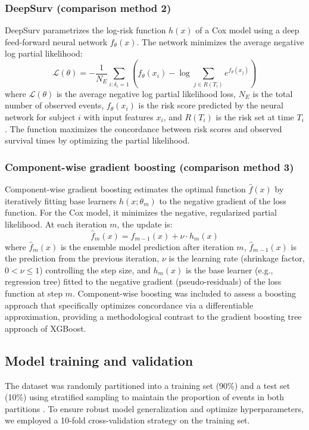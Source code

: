 \documentclass[pdflatex,sn-mathphys-num]{sn-jnl}%
\theoremstyle{thmstyleone}%
\theoremstyle{thmstyletwo}%
\theoremstyle{thmstylethree}%
\begin{document}
\subsubsection{DeepSurv (comparison method 2)}
DeepSurv \cite{katzman2018deepsurv} parametrizes the log-risk function $h(x)$ of a Cox model using a deep feed-forward neural network $f_\theta(x)$. The network minimizes the average negative log partial likelihood:
\begin{equation}
\mathcal{L}(\theta) = -\frac{1}{N_{E}} \sum_{i: \delta_i=1} \left( f_\theta(x_i) - \log \sum_{j \in R(T_i)} e^{f_\theta(x_j)} \right)
\end{equation}
where $\mathcal{L}(\theta)$ is the average negative log partial likelihood loss, $N_E$ is the total number of observed events, $f_\theta(x_i)$ is the risk score predicted by the neural network for subject $i$ with input features $x_i$, and $R(T_i)$ is the risk set at time $T_i$. The function maximizes the concordance between risk scores and observed survival times by optimizing the partial likelihood.

\subsubsection{Component-wise gradient boosting (comparison method 3)}
Component-wise gradient boosting \cite{hothorn2010model} estimates the optimal function $\hat{f}(x)$ by iteratively fitting base learners $h(x; \theta_m)$ to the negative gradient of the loss function. For the Cox model, it minimizes the negative, regularized partial likelihood. At each iteration $m$, the update is:
\begin{equation}
\hat{f}_m(x) = \hat{f}_{m-1}(x) + \nu \cdot h_m(x)
\end{equation}
where $\hat{f}_m(x)$ is the ensemble model prediction after iteration $m$, $\hat{f}_{m-1}(x)$ is the prediction from the previous iteration, $\nu$ is the learning rate (shrinkage factor, $0 < \nu \le 1$) controlling the step size, and $h_m(x)$ is the base learner (e.g., regression tree) fitted to the negative gradient (pseudo-residuals) of the loss function at step $m$. Component-wise boosting was included to assess a boosting approach that specifically optimizes concordance via a differentiable approximation, providing a methodological contrast to the gradient boosting tree approach of XGBoost.

\subsection{Model training and validation}
The dataset was randomly partitioned into a training set (90\%) and a test set (10\%) using stratified sampling to maintain the proportion of events in both partitions \cite{kuhn2008building, steyerberg2019clinical}. To ensure robust model generalization and optimize hyperparameters, we employed a 10-fold cross-validation strategy on the training set.
\end{document}
